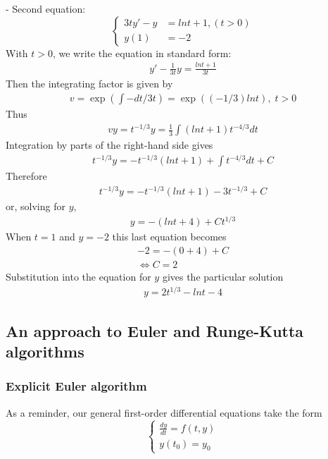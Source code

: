 \documentclass[a4paper]{article}
\begin{document}
- Second equation:
\begin{equation*}
  \begin{cases}
    3ty' - y & = lnt + 1, (t > 0) \\
    y(1)     & = -2
  \end{cases}
\end{equation*}
With \(t > 0\), we write the equation in standard form:
\begin{align*}
  y' - \frac{1}{3t}y = \frac{lnt + 1}{3t}
\end{align*}
Then the integrating factor is given by
\begin{align*}
  v = \exp \left(\int -dt/3t\right) = \exp((-1/3)lnt), \;t > 0
\end{align*}
Thus
\begin{align*}
  vy = t^{-1/3} y = \frac{1}{3} \int(lnt + 1) t^{-4/3} dt
\end{align*}
Integration by parts of the right-hand side gives
\begin{align*}
  t^{-1/3}y = -t^{-1/3}(lnt+1) + \int t^{-4/3}dt + C
\end{align*}
Therefore
\begin{align*}
  t^{-1/3}y = -t^{-1/3}(lnt+1) - 3t^{-1/3} + C
\end{align*}
or, solving for \(y\),
\begin{align*}
  y = -(lnt + 4) + Ct^{1/3}
\end{align*}
When \(t = 1\) and \(y = -2\) this last equation becomes
\begin{align*}
  -2 = -(0+4) + C \\
  \Leftrightarrow C = 2
\end{align*}
Substitution into the equation for \(y\) gives the particular solution
\begin{align*}
  y = 2t^{1/3} - lnt - 4
\end{align*}

\subsection{An approach to Euler and Runge-Kutta algorithms}
\subsubsection{Explicit Euler algorithm}\label{sssec:explicit_euler}
As a reminder, our general first-order differential equations take the form
\begin{equation*}
  \begin{cases}
    \frac{dy}{dt} = f(t,y) \\
    y(t_0) = y_0
  \end{cases}
\end{equation*}
\end{document}
